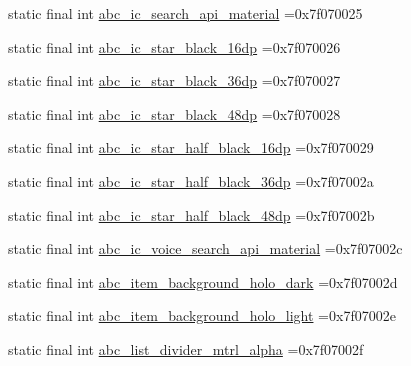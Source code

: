 \begin{DoxyCompactItemize}
\item 
static final int \mbox{\hyperlink{classbr_1_1unb_1_1cic_1_1mp_1_1marketmaster_1_1R_1_1drawable_abbdc91a113ae8be35c6a7e1e2a10e8e3}{abc\+\_\+ic\+\_\+search\+\_\+api\+\_\+material}} =0x7f070025
\item 
static final int \mbox{\hyperlink{classbr_1_1unb_1_1cic_1_1mp_1_1marketmaster_1_1R_1_1drawable_a836c5b3afae8a1c1a9829b3b9a24d899}{abc\+\_\+ic\+\_\+star\+\_\+black\+\_\+16dp}} =0x7f070026
\item 
static final int \mbox{\hyperlink{classbr_1_1unb_1_1cic_1_1mp_1_1marketmaster_1_1R_1_1drawable_a07d86649c4f8c2205ace40313f55edb3}{abc\+\_\+ic\+\_\+star\+\_\+black\+\_\+36dp}} =0x7f070027
\item 
static final int \mbox{\hyperlink{classbr_1_1unb_1_1cic_1_1mp_1_1marketmaster_1_1R_1_1drawable_a9e38fac02e60941bb3c3bdcdd0d3ed14}{abc\+\_\+ic\+\_\+star\+\_\+black\+\_\+48dp}} =0x7f070028
\item 
static final int \mbox{\hyperlink{classbr_1_1unb_1_1cic_1_1mp_1_1marketmaster_1_1R_1_1drawable_ab24e88cf7ba4f2d42740f9fb0097dee4}{abc\+\_\+ic\+\_\+star\+\_\+half\+\_\+black\+\_\+16dp}} =0x7f070029
\item 
static final int \mbox{\hyperlink{classbr_1_1unb_1_1cic_1_1mp_1_1marketmaster_1_1R_1_1drawable_a82d1e49cef8687553e9027a43fc95864}{abc\+\_\+ic\+\_\+star\+\_\+half\+\_\+black\+\_\+36dp}} =0x7f07002a
\item 
static final int \mbox{\hyperlink{classbr_1_1unb_1_1cic_1_1mp_1_1marketmaster_1_1R_1_1drawable_a81c2d43a9241ac9b08284549e50d3aed}{abc\+\_\+ic\+\_\+star\+\_\+half\+\_\+black\+\_\+48dp}} =0x7f07002b
\item 
static final int \mbox{\hyperlink{classbr_1_1unb_1_1cic_1_1mp_1_1marketmaster_1_1R_1_1drawable_a6f2c35755057ec08cacb998a34e6a9a2}{abc\+\_\+ic\+\_\+voice\+\_\+search\+\_\+api\+\_\+material}} =0x7f07002c
\item 
static final int \mbox{\hyperlink{classbr_1_1unb_1_1cic_1_1mp_1_1marketmaster_1_1R_1_1drawable_acbfefe3c728aa3aed994e1223fba5994}{abc\+\_\+item\+\_\+background\+\_\+holo\+\_\+dark}} =0x7f07002d
\item 
static final int \mbox{\hyperlink{classbr_1_1unb_1_1cic_1_1mp_1_1marketmaster_1_1R_1_1drawable_af7a1b89b3d39331424d1f3e07ccfd17c}{abc\+\_\+item\+\_\+background\+\_\+holo\+\_\+light}} =0x7f07002e
\item 
static final int \mbox{\hyperlink{classbr_1_1unb_1_1cic_1_1mp_1_1marketmaster_1_1R_1_1drawable_ab5cfaec8c7ecb2eb2a5c88afd7e9b33b}{abc\+\_\+list\+\_\+divider\+\_\+mtrl\+\_\+alpha}} =0x7f07002f

\end{DoxyCompactItemize}

